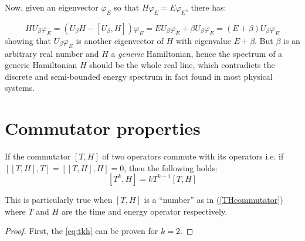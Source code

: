 \documentclass[a4paper,12pt]{article}
\begin{document}
Now, given an eigenvector $\varphi_{E}$ so that $H\varphi_{E}=E\varphi_{E}$, there has:

$$
HU_{\beta}\varphi_{E} = (U_{\beta}H - [U_{\beta}, H])\varphi_{E} =
EU_{\beta}\varphi_{E} + \beta U_{\beta}\varphi_{E} = (E+\beta)U_{\beta}\varphi_{E}
$$
showing that $U_{\beta}\varphi_{E}$ is another eigenvector of $H$ with eigenvalue
$E+\beta$. But $\beta$ is an arbitrary real number and $H$ a \emph{generic} Hamiltonian,
hence the spectrum of a generic Hamiltonian $H$ should
be the whole real line, which contradicts the discrete and semi-bounded energy spectrum
in fact found in most physical systems.

\appendix\section{Commutator properties}\label{CommProp}
\begin{lemma}
If the commutator $[T, H]$ of two operators commute with its operators i.e. if
$[[T, H], T] = [[T, H], H] = 0$, then the following holds:
$$
[T^k, H] = kT^{k-1}[T, H]\label{eq:tkh}
$$
\end{lemma}
This is particularly true when $[T, H]$ is a ``number'' as in (\ref{THcommutator}) where
$T$ and $H$ are the time and energy operator respectively.
\begin{proof}
First, the \ref{eq:tkh} can be proven for $k=2$.
\end{proof}



\end{document}
